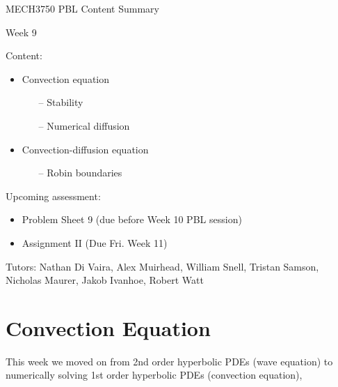 \documentclass[12pt]{article}
\begin{document}
\begin{center}
{\Huge   MECH3750 PBL Content Summary}

\vspace{6mm}

{\Huge  Week 9}

\end{center}

\vspace{6mm}

{\Large Content:}
{\begin{itemize}
	\item Convection equation
	\begin{itemize}
		\item[--] Stability
		\item[--] Numerical diffusion
	\end{itemize}
	\item Convection-diffusion equation
	\begin{itemize}
		\item[--] Robin boundaries
	\end{itemize}
\end{itemize}}

\vspace{4mm}

{\Large Upcoming assessment:}
{\begin{itemize}
	\item Problem Sheet 9 (due before Week 10 PBL session)
	\item Assignment II (Due Fri. Week 11)
\end{itemize}}

\vspace{4mm}

{Tutors: Nathan Di Vaira, Alex Muirhead, William Snell, Tristan Samson, Nicholas Maurer, Jakob Ivanhoe, Robert Watt}


\pagebreak

\section{Convection Equation}

This week we moved on from 2nd order hyperbolic PDEs (wave equation) to numerically solving 1st order hyperbolic PDEs (convection equation),

\vspace{2mm}
\end{document}
